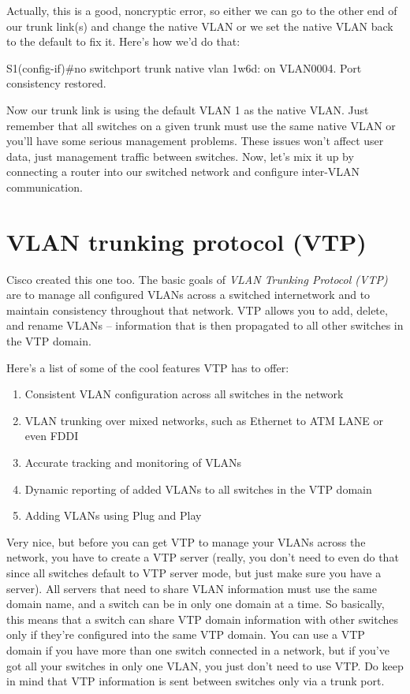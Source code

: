 Actually, this is a good, noncryptic error, so either we can go to the
other end of our trunk link(s) and change the native VLAN or we set the
native VLAN back to the default to fix it. Here's how we'd do that:

\begin{cli}
S1(config-if)#no switchport trunk native vlan
1w6d: %
on VLAN0004. Port consistency restored.
\end{cli}

Now our trunk link is using the default VLAN 1 as the native VLAN.
Just remember that all switches on a given trunk must use the same native VLAN or you'll have some serious management problems.
These issues won't affect user data, just management traffic between switches.
Now, let's mix it up by connecting a router into our switched network and configure inter-VLAN communication.




\section{VLAN trunking protocol (VTP)}

Cisco created this one too. The basic goals of \emph{VLAN Trunking
Protocol (VTP)} are to manage all configured VLANs across a switched
internetwork and to maintain consistency throughout that network. VTP
allows you to add, delete, and rename VLANs -- information that is then
propagated to all other switches in the VTP domain.

Here's a list of some of the cool features VTP has to offer:

\begin{enumerate}
\item
  Consistent VLAN configuration across all switches in the network
\item
  VLAN trunking over mixed networks, such as Ethernet to ATM LANE or
  even FDDI
\item
  Accurate tracking and monitoring of VLANs
\item
  Dynamic reporting of added VLANs to all switches in the VTP domain
\item
  Adding VLANs using Plug and Play
\end{enumerate}

Very nice, but before you can get VTP to manage your VLANs across the
network, you have to create a VTP server (really, you don't need to even
do that since all switches default to VTP server mode, but just make
sure you have a server). All servers that need to share VLAN information
must use the same domain name, and a switch can be in only one domain at
a time. So basically, this means that a switch can share VTP domain
information with other switches only if they're configured into the same
VTP domain. You can use a VTP domain if you have more than one switch
connected in a network, but if you've got
all your switches in
only one VLAN, you just don't need to use VTP. Do keep in mind that VTP
information is sent between switches only via a trunk port.

